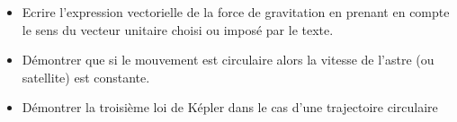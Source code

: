 \begin{itemize}
	\item Ecrire l'expression vectorielle de la force de gravitation en prenant en compte le sens du vecteur unitaire choisi ou imposé par le texte.
	\item Démontrer que si le mouvement est circulaire alors la vitesse de l'astre (ou satellite) est constante.
	\item Démontrer la troisième loi de Képler dans le cas d'une trajectoire circulaire
\end{itemize}

